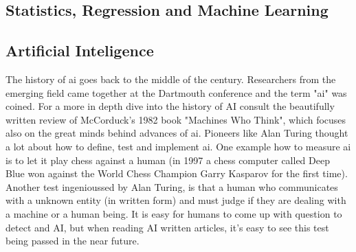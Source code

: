 

\subsection{Statistics, Regression and Machine Learning}
\subsection{Artificial Inteligence}

The history of \gls{ai} goes back to the middle of the  century. 
Researchers from the emerging field came together at the Dartmouth conference and the term "\gls{ai}" was coined\cite{McCarthy1955}. 
For a more in depth dive into the history of AI consult the beautifully written review\cite{Apter1982} of McCorduck's 1982 book "Machines Who Think"\cite{McCorduck1982}, which focuses also on the great minds behind advances of \gls{ai}.
Pioneers like Alan Turing thought a lot about how to define, test and implement \gls{ai}\cite{Howard2019}. 
One example how to measure \gls{ai} is to let it play chess against a human\cite{Silver2017} 
(in 1997 a chess computer called Deep Blue won against the World Chess Champion Garry Kasparov for the first time\cite{Feng1999}).
Another test ingenioussed by Alan Turing, is that a human who communicates with a unknown entity (in written form) and must judge if they are dealing with a machine or a human being. 
It is easy for humans to come up with question to detect and AI, 
but when reading AI written articles\cite{gpt2020}, it's easy to see this test being passed in the near future. 

